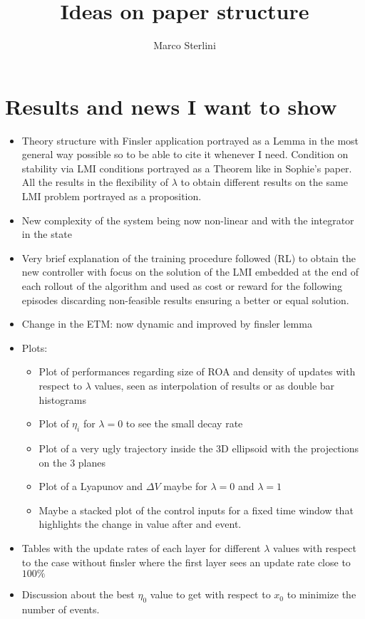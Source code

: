 \documentclass{article}
\begin{document}
\date{}
\author{Marco Sterlini}

\title{Ideas on paper structure}
\maketitle

\section{Results and news I want to show}
\begin{itemize}
  \item Theory structure with Finsler application portrayed as a Lemma in the most general way possible so to be able to cite it whenever I need. Condition on stability via LMI conditions portrayed as a Theorem like in Sophie's paper. All the results in the flexibility of $\lambda$ to obtain different results on the same LMI problem portrayed as a proposition.
  \item New complexity of the system being now non-linear and with the integrator in the state
  \item Very brief explanation of the training procedure followed (RL) to obtain the new controller with focus on the solution of the LMI embedded at the end of each rollout of the algorithm and used as cost or reward for the following episodes discarding non-feasible results ensuring a better or equal solution.
  \item Change in the ETM: now dynamic and improved by finsler lemma
  \item Plots:
  \begin{itemize}
    \item Plot of performances regarding size of ROA and density of updates with respect to $\lambda$ values, seen as interpolation of results or as double bar histograms
    \item Plot of $\eta_i$ for $\lambda = 0$ to see the small decay rate
    \item Plot of a very ugly trajectory inside the 3D ellipsoid with the projections on the 3 planes
    \item Plot of a Lyapunov and $\Delta V$ maybe for $\lambda = 0$ and $\lambda = 1$
    \item Maybe a stacked plot of the control inputs for a fixed time window that highlights the change in value after and event.
  \end{itemize}
  \item Tables with the update rates of each layer for different $\lambda$ values with respect to the case without finsler where the first layer sees an update rate close to $100\%$
  \item Discussion about the best $\eta_0$ value to get with respect to $x_0$ to minimize the number of events.
\end{itemize}
\end{document}
